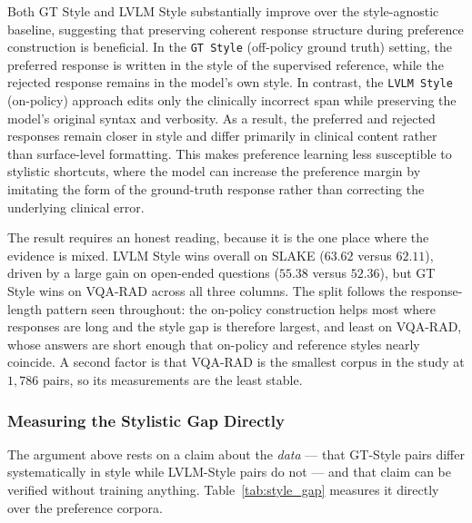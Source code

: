 Both GT Style and LVLM Style substantially improve over the style-agnostic baseline, suggesting that preserving coherent response structure during preference construction is beneficial. In the \texttt{GT Style} (off-policy ground truth) setting, the preferred response is written in the style of the supervised reference, while the rejected response remains in the model's own style. In contrast, the \texttt{LVLM Style} (on-policy) approach edits only the clinically incorrect span while preserving the model's original syntax and verbosity. As a result, the preferred and rejected responses remain closer in style and differ primarily in clinical content rather than surface-level formatting. This makes preference learning less susceptible to stylistic shortcuts, where the model can increase the preference margin by imitating the form of the ground-truth response rather than correcting the underlying clinical error.

The result requires an honest reading, because it is the one place where the evidence is mixed. LVLM Style wins overall on SLAKE ($63.62$ versus $62.11$), driven by a large gain on open-ended questions ($55.38$ versus $52.36$), but GT Style wins on VQA-RAD across all three columns. The split follows the response-length pattern seen throughout: the on-policy construction helps most where responses are long and the style gap is therefore largest, and least on VQA-RAD, whose answers are short enough that on-policy and reference styles nearly coincide. A second factor is that VQA-RAD is the smallest corpus in the study at $1{,}786$ pairs, so its measurements are the least stable.

\subsubsection{Measuring the Stylistic Gap Directly}
\label{sec:res:style-gap}

The argument above rests on a claim about the \emph{data} --- that GT-Style pairs differ systematically in style while LVLM-Style pairs do not --- and that claim can be verified without training anything. Table~\ref{tab:style_gap} measures it directly over the preference corpora.

